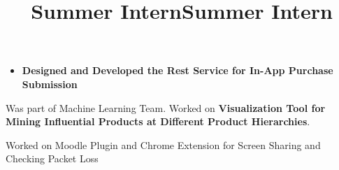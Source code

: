 \begin{resume}
\begin{position}
\begin{itemize}
\item \textbf{Designed and Developed the Rest Service for In-App Purchase Submission}

\end{itemize}
\end{position}


\title{Summer Intern}
\begin{position}
Was part of Machine Learning Team. Worked on \textbf{Visualization Tool for Mining
Influential Products at Different Product Hierarchies}.
\end{position}

\title{Summer Intern}
\begin{position}
Worked on Moodle Plugin and Chrome Extension for Screen Sharing and Checking Packet Loss
\end{position}












\end{resume}

